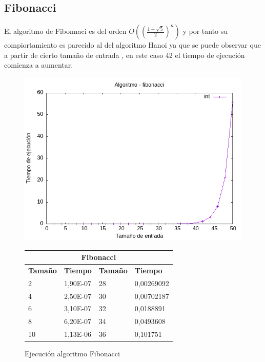 \documentclass[11pt]{article}
\begin{document}
\subsection*{Fibonacci}
El algoritmo de Fibonnaci es del orden $O((\frac{1+\sqrt{5}}{2})^n)$ y por tanto su compiortamiento es parecido al del algoritmo Hanoi ya que se puede
observar que a partir de cierto tamaño de entrada , en este caso 42 el tiempo de ejecución comienza a aumentar.
\begin{figure}[H]
    \begin{minipage}{0.5\textwidth}
        \centering
        \includegraphics[width=\linewidth]{assets/Img/fibonacciint.png}
        \caption{Ejecución algoritmo Fibonacci}
        \label{fig:fibonacci}
    \end{minipage}%
    \begin{minipage}{0.5\textwidth}
        \centering
        \small
        \begin{tabular}{|l|l|l|l|}
        \hline
        \multicolumn{4}{|c|}{\cellcolor{blue!20}\textbf{Fibonacci}} \\ \hline 
        \textbf{Tamaño} & \textbf{Tiempo} & \textbf{Tamaño} & \textbf{Tiempo} \\ \hline
        2 & 1,90E-07 & 28 & 0,00269092 \\ \hline
        4 & 2,50E-07 & 30 & 0,00702187 \\ \hline
        6 & 3,10E-07 & 32 & 0,0188891 \\ \hline
        8 & 6,20E-07 & 34 & 0,0493608 \\ \hline
        10 & 1,13E-06 & 36 & 0,101751 \\ \hline

\end{tabular}
\end{minipage}
\end{figure}
\end{document}
